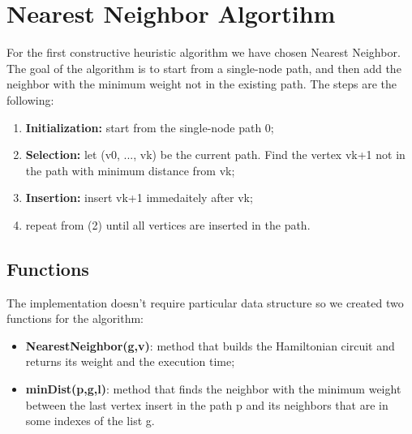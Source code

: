 \section{Nearest Neighbor Algortihm}\label{nearest}
For the first constructive heuristic algorithm we have chosen Nearest Neighbor. The goal of the algorithm is to start from a single-node path, and then add the neighbor with the minimum weight not in the existing path. The steps are the following:\\

\begin{enumerate}
	\item  \textbf{Initialization:} start from the single-node path 0;
	\item  \textbf{Selection:} let (v0, ..., vk) be the current path. Find the vertex vk+1 not in the path with minimum distance from vk;
	\item  \textbf{Insertion:} insert vk+1 immedaitely after vk;
	\item repeat from (2) until all vertices are inserted in the path.
\end{enumerate}  


\subsection{Functions}
The implementation doesn't require particular data structure so we created two functions for the algorithm:
\begin{itemize}
	\item  \textbf{NearestNeighbor(g,v)}: method that builds the Hamiltonian circuit and returns its weight and the execution time;
	\item  \textbf{minDist(p,g,l)}: method that finds the neighbor with the minimum weight between the last vertex insert in the path p and its neighbors that are in some indexes of the list g.
\end{itemize}


